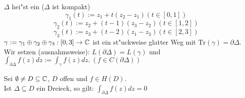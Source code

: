 \documentclass[a4paper,twoside,DIV15,BCOR12mm]{scrbook}
\def\Tr{\text{Tr}}
\begin{document}
$\Delta$ hei"st ein  ($\Delta$ ist kompakt)
\[
\gamma_1(t):=z_1+t(z_2-z_1) (t \in [0,1])
\]
\[
\gamma_2(t):=z_2+(t-1)(z_3-z_2) (t \in [1,2])
\]
\[
\gamma_3(t):=z_3+(t-2)(z_1-z_3) (t \in [2,3])
\]
$\gamma := \gamma_1\oplus\gamma_2\oplus\gamma_3: [0,3] \rightarrow \mathbb{C}$ ist ein st"uckweise glatter Weg mit $\Tr(\gamma) = \partial\Delta.$\\
Wir setzen (ausnahmsweise): $L(\partial\Delta) = L(\gamma)$ und $\int_{\partial\Delta} f(z)dz:=\int_{\gamma} f(z)dz.\ (f \in C(\partial\Delta)) $


\begin{satz}
Sei $\emptyset \not= D \subseteq \mathbb{C}$, $D$ offen und $f\in H(D)$.\\
Ist $\Delta \subseteq D$ ein Dreieck, so gilt: $\int_{\partial\Delta}f(z)dz = 0$
\end{satz}
\end{document}
